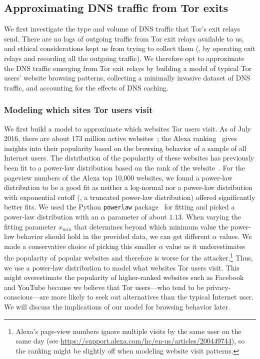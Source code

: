 \subsection{Approximating DNS traffic from Tor exits}
\label{sec:attack:sim}

We first investigate the type and volume of DNS traffic that Tor's exit relays
send.  There are no logs of outgoing traffic
from Tor exit relays available to us, and ethical considerations kept us
from trying to collect them (\eg, by operating exit relays and recording
all the outgoing traffic). We therefore opt to approximate the DNS traffic
emerging from Tor exit relays by \first building a model of typical Tor
users' website browsing patterns, \second collecting a minimally invasive
dataset of DNS traffic, and \third accounting for the effects of DNS caching.

\subsubsection{Modeling which sites Tor users visit}
\label{sec:attack:pop}

We first build a model to approximate {which websites} Tor users visit.
As of July 2016, there are about 173 million active
websites~\cite{numberofwebsites}; the Alexa ranking~\cite{alexatop1k}
gives insights into their popularity based on the browsing behavior of
a sample of all Internet users. The distribution of the popularity of
these websites has previously been fit to a power-law distribution based
on the rank of the
website~\cite{Ali2007a,Clauset2009a,Mahanti2013a}.
For the pageview numbers of the Alexa top 10,000 websites, we found a
power-law distribution to be a good fit as neither a log-normal nor a
power-law distribution with exponential cutoff (\ie, a truncated power-law
distribution) offered significantly better fits.
We used the Python {\tt powerlaw} package~\cite{Alstott2014a} for fitting and
picked a power-law distribution with an $\alpha$ parameter of about $1.13$.
When varying the fitting parameter $x_{min}$ that determines beyond which
minimum value the power-law behavior should hold in the provided data, we can
get different $\alpha$ values. We made a conservative choice of picking this
smaller $\alpha$ value as it underestimates the popularity of popular websites
and therefore is worse for the attacker.\footnote{Alexa's page-view numbers
ignore multiple visits by the same user on the same day (see
\url{https://support.alexa.com/hc/en-us/articles/200449744}), so the ranking
might be slightly off when modeling website visit patterns.}
Thus, we use a power-law distribution to model what websites Tor users visit.
This might overestimate the popularity of higher-ranked websites such as
Facebook and YouTube because we believe that Tor users---who tend to be
privacy-conscious---are more likely to seek out alternatives than the typical
Internet user.  We will discuss the implications of our model for browsing
behavior later.

